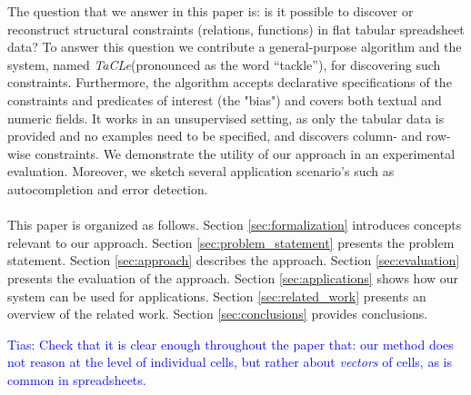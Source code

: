 \documentclass{sig-alternate-05-2015}
\newcommand{\tias}[1]{\textcolor{blue}{{\sc Tias:} #1}\xspace}
\newcommand{\format}[1]{\textit{#1}\xspace}
\newcommand{\sname}{\format{TaCLe}}
\begin{document}
The question that we answer in this paper is: is it possible to discover or reconstruct structural constraints (relations, functions) in flat tabular spreadsheet data?
To answer this question we contribute a general-purpose algorithm and the system, named \sname (pronounced as the word ``tackle''), for discovering such constraints. Furthermore, the algorithm accepts declarative specifications of the constraints and predicates of interest (the "bias") and covers both textual and numeric fields. It works in an unsupervised setting, as only the tabular data is provided and no examples need to be specified, and discovers column- and row-wise constraints.
We demonstrate the utility of our approach in an experimental evaluation.
Moreover, we sketch several application scenario's such as autocompletion and error detection.
\\\\
This paper is organized as follows.
Section \ref{sec:formalization} introduces concepts relevant to our approach. Section \ref{sec:problem_statement} presents the problem statement. Section \ref{sec:approach} describes the approach. Section \ref{sec:evaluation} presents the evaluation of the approach. Section \ref{sec:applications} shows how our system can be used for applications. Section \ref{sec:related_work} presents an overview of the related work. Section \ref{sec:conclusions} provides conclusions.

\tias{Check that it is clear enough throughout the paper that: our method does not reason at the level of individual cells, but rather about \textit{vectors} of cells, as is common in spreadsheets.}

\end{document}
